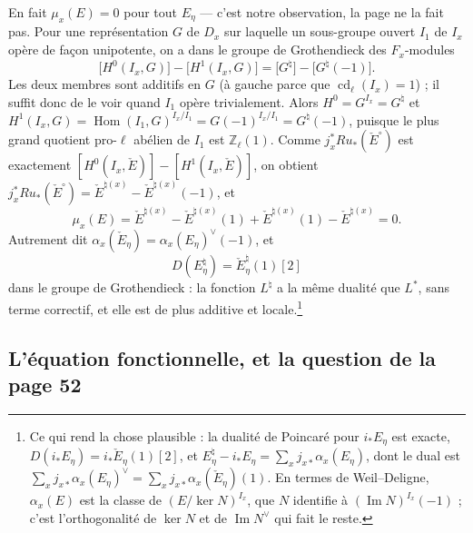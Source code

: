 \documentclass[11pt,a4paper]{article}
\begin{document}
En fait $\mu_x(E) = 0$ pour tout $E_\eta$ --- c'est notre observation, la page
ne la fait pas. Pour une représentation $G$ de $D_x$ sur laquelle un
sous-groupe ouvert $I_1$ de $I_x$ opère de façon unipotente, on a dans le groupe
de Grothendieck des $F_x$-modules
\[
  \bigl[H^0(I_x, G)\bigr] - \bigl[H^1(I_x, G)\bigr] = \bigl[G^{\natural}\bigr] - \bigl[G^{\natural}(-1)\bigr] .
\]
Les deux membres sont additifs en $G$ (à gauche parce que
$\operatorname{cd}_\ell(I_x) = 1$) ; il suffit donc de le voir quand $I_1$ opère
trivialement. Alors $H^0 = G^{I_x} = G^{\natural}$ et
$H^1(I_x, G) = \operatorname{Hom}(I_1, G)^{I_x/I_1} = G(-1)^{I_x/I_1} =
G^{\natural}(-1)$, puisque le plus grand quotient pro-$\ell$ abélien de $I_1$ est
$\mathbb{Z}_\ell(1)$. Comme $j_x^{*}Ru_{*}(\check E^{\circ})$ est exactement
$[H^0(I_x, \check E)] - [H^1(I_x, \check E)]$, on obtient
$j_x^{*}Ru_{*}(\check E^{\circ}) = \check E^{\natural(x)} - \check E^{\natural(x)}(-1)$,
et
\[
  \mu_x(E) = \check E^{\natural(x)} - \check E^{\natural(x)}(1)
           + \check E^{\natural(x)}(1) - \check E^{\natural(x)} = 0 .
\]
Autrement dit $\alpha_x(\check E_\eta) = \alpha_x(E_\eta)^{\vee}(-1)$, et
\[
  D(E_\eta^{\natural}) = \check E_\eta^{\natural}(1)[2]
\]
dans le groupe de Grothendieck : la fonction $L^{\natural}$ a la même dualité
que $L^{*}$, sans terme correctif, et elle est de plus additive et
locale.\footnote{Ce qui rend la chose plausible : la dualité de Poincaré pour
$i_{*}E_\eta$ est exacte, $D(i_{*}E_\eta) = i_{*}\check E_\eta(1)[2]$, et
$E_\eta^{\natural} - i_{*}E_\eta = \sum_x j_{x*}\alpha_x(E_\eta)$, dont le dual
est $\sum_x j_{x*}\alpha_x(E_\eta)^{\vee} = \sum_x j_{x*}\alpha_x(\check E_\eta)(1)$.
En termes de Weil--Deligne, $\alpha_x(E)$ est la classe de
$(E/\ker N)^{I_x}$, que $N$ identifie à $(\operatorname{Im}N)^{I_x}(-1)$ ;
c'est l'orthogonalité de $\ker N$ et de $\operatorname{Im}N^{\vee}$ qui fait
le reste.}

\subsection*{L'équation fonctionnelle, et la question de la page 52}
\end{document}
